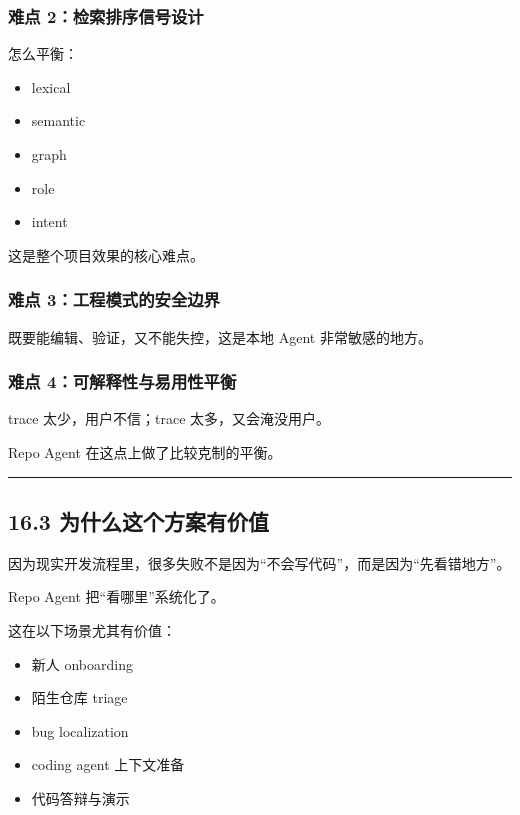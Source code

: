 \documentclass[UTF8,12pt,openany]{ctexbook}
\begin{document}
\subsubsection{难点 2：检索排序信号设计}

怎么平衡：\par

\begin{itemize}
\item lexical
\item semantic
\item graph
\item role
\item intent
\end{itemize}

这是整个项目效果的核心难点。\par

\subsubsection{难点 3：工程模式的安全边界}

既要能编辑、验证，又不能失控，这是本地 Agent 非常敏感的地方。\par

\subsubsection{难点 4：可解释性与易用性平衡}

trace 太少，用户不信；trace 太多，又会淹没用户。  \par
Repo Agent 在这点上做了比较克制的平衡。\par

\hrule

\subsection{16.3 为什么这个方案有价值}

因为现实开发流程里，很多失败不是因为“不会写代码”，而是因为“先看错地方”。\par

Repo Agent 把“看哪里”系统化了。  \par
这在以下场景尤其有价值：\par

\begin{itemize}
\item 新人 onboarding
\item 陌生仓库 triage
\item bug localization
\item coding agent 上下文准备
\item 代码答辩与演示
\end{itemize}
\end{document}
